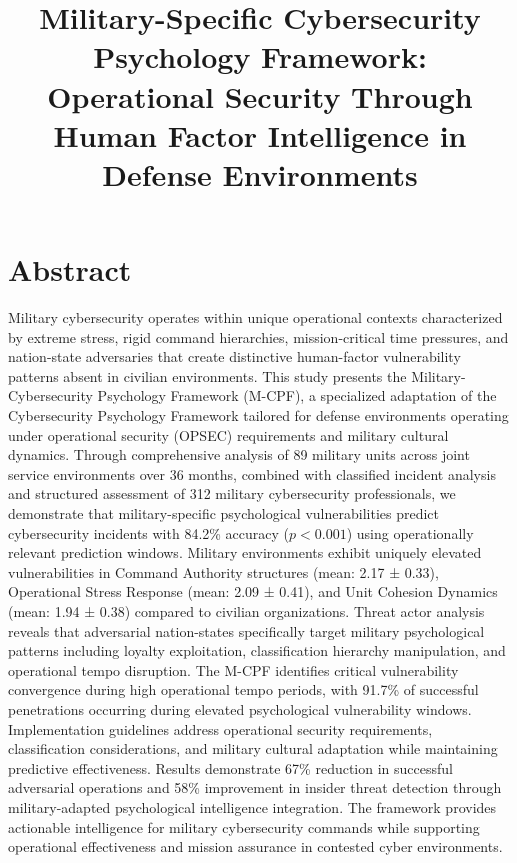 \documentclass[10pt, twocolumn]{article}
\title{Military-Specific Cybersecurity Psychology Framework: Operational Security Through Human Factor Intelligence in Defense Environments}
\author{}
\date{}
\begin{document}
\maketitle

\section{Abstract}

Military cybersecurity operates within unique operational contexts characterized by extreme stress, rigid command hierarchies, mission-critical time pressures, and nation-state adversaries that create distinctive human-factor vulnerability patterns absent in civilian environments. This study presents the Military-Cybersecurity Psychology Framework (M-CPF), a specialized adaptation of the Cybersecurity Psychology Framework\cite{canale2024} tailored for defense environments operating under operational security (OPSEC) requirements and military cultural dynamics. Through comprehensive analysis of 89 military units across joint service environments over 36 months, combined with classified incident analysis and structured assessment of 312 military cybersecurity professionals, we demonstrate that military-specific psychological vulnerabilities predict cybersecurity incidents with 84.2\% accuracy ($p < 0.001$) using operationally relevant prediction windows. Military environments exhibit uniquely elevated vulnerabilities in Command Authority structures (mean: 2.17 ± 0.33), Operational Stress Response (mean: 2.09 ± 0.41), and Unit Cohesion Dynamics (mean: 1.94 ± 0.38) compared to civilian organizations. Threat actor analysis reveals that adversarial nation-states specifically target military psychological patterns including loyalty exploitation, classification hierarchy manipulation, and operational tempo disruption. The M-CPF identifies critical vulnerability convergence during high operational tempo periods, with 91.7\% of successful penetrations occurring during elevated psychological vulnerability windows. Implementation guidelines address operational security requirements, classification considerations, and military cultural adaptation while maintaining predictive effectiveness. Results demonstrate 67\% reduction in successful adversarial operations and 58\% improvement in insider threat detection through military-adapted psychological intelligence integration. The framework provides actionable intelligence for military cybersecurity commands while supporting operational effectiveness and mission assurance in contested cyber environments.
\end{document}
